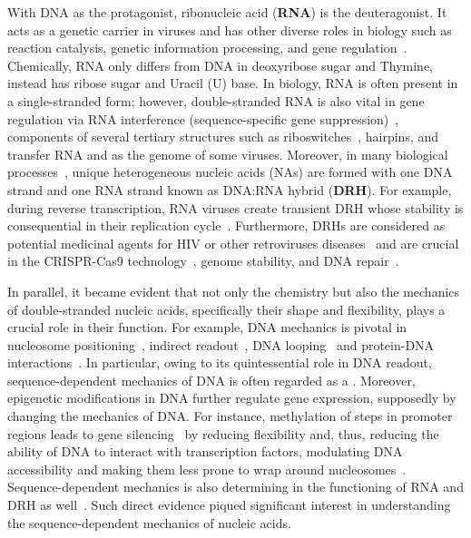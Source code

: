 With DNA as the protagonist, ribonucleic acid (\textbf{RNA}) is the deuteragonist.
It acts as a genetic carrier in viruses and has other diverse roles in biology such as reaction catalysis, genetic information processing, and gene regulation~\cite{mandal2004gene,fire1998potent,vsponer2006computational}.
Chemically, RNA only differs from DNA in deoxyribose sugar and Thymine, instead has ribose sugar and Uracil (U) base. 
In biology, RNA is often present in a single-stranded form; however, double-stranded RNA is also vital in gene regulation via RNA interference (sequence-specific gene suppression)~\cite{fire1998potent}, components of several tertiary structures such as riboswitches~\cite{mandal2004gene}, hairpins, and transfer RNA and as the genome of some viruses.
Moreover, in many biological processes~\cite{adams2012biochemistry,vella1994molecular,rich1960hybrid,brambati2020dark,meselson1958replication,shaw2008recognition}, unique heterogeneous nucleic acids (NAs) are formed with one DNA strand and one RNA strand known as DNA:RNA hybrid (\textbf{DRH}).
For example, during reverse transcription, RNA viruses create transient DRH whose stability is consequential in their replication cycle~\cite{vella1994molecular,brambati2020dark,marin2019sequence}.
Furthermore, DRHs are considered as potential medicinal agents for HIV or other retroviruses diseases~\cite{tisdale1991mutations,shaw2008recognition} and are crucial in the CRISPR-Cas9 technology~\cite{sternberg2015conformational}, genome stability, and DNA repair~\cite{ohle2016transient}.

In parallel, it became evident that not only the chemistry but also the mechanics of double-stranded nucleic acids, specifically their shape and flexibility, plays a crucial role in their function.
For example, DNA mechanics is pivotal in nucleosome positioning~\cite{segal2006genomic,segal2009controls}, indirect readout~\cite{chen2001indirect,napoli2006indirect}, DNA looping~\cite{schleif1992dna,adhya1989multipartite,basu2021measuring} and protein-DNA interactions~\cite{chen2001indirect,napoli2006indirect,rohs2009role,paillard2004analyzing,juo1996proteins}.
In particular, owing to its quintessential role in DNA readout, sequence-dependent mechanics of DNA is often regarded as a .
Moreover, epigenetic modifications in DNA further regulate gene expression, supposedly by changing the mechanics of DNA.
For instance, methylation of \cpg steps in promoter regions leads to gene silencing~\cite{cedar2009linking,pennings2005dna} by reducing flexibility and, thus, reducing the ability of DNA to interact with transcription factors, modulating DNA accessibility and making them less prone to wrap around nucleosomes~\cite{cortini2016physics,perez2012impact,portella2013understanding,hognon2019cooperative,rohs2010origins}.
Sequence-dependent mechanics is also determining in the functioning of RNA and DRH as well~\cite{shaw2008recognition,stein1969enzyme,yesselman2019sequence,noy2005structure,suresh2014dna,noy2008theoretical}.
Such direct evidence piqued significant interest in understanding the sequence-dependent mechanics of nucleic acids.

